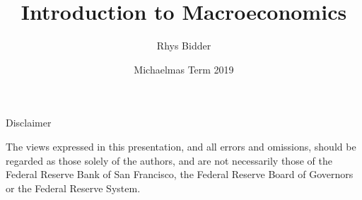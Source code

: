 \documentclass{beamer}
\begin{document}
\title[Introduction]{Introduction to Macroeconomics}
\author[Bidder]{Rhys Bidder}
\date{Michaelmas Term 2019}
\maketitle


\begin{frame}{Disclaimer}

The views expressed in this presentation, and all errors and omissions, should be regarded as those solely of the authors, and are not necessarily those of the Federal Reserve Bank of San Francisco, the Federal Reserve Board of Governors or the Federal Reserve System.

\end{frame}









\end{document}
